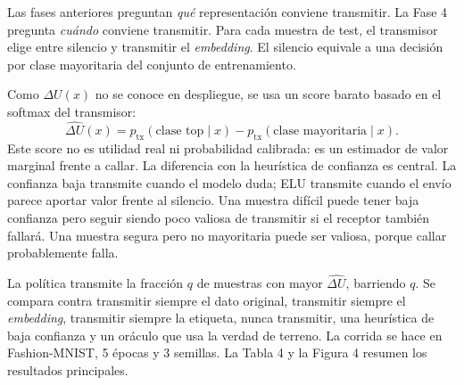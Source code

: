 Las fases anteriores preguntan \emph{qu\'e} representaci\'on conviene transmitir. La Fase 4 pregunta \emph{cu\'ando} conviene transmitir. Para cada muestra de test, el transmisor elige entre silencio y transmitir el \emph{embedding}. El silencio equivale a una decisi\'on por clase mayoritaria del conjunto de entrenamiento.

Como $\Delta U(x)$ no se conoce en despliegue, se usa un score barato basado en el softmax del transmisor:
\begin{equation}
\widehat{\Delta U}(x)=p_{\mathrm{tx}}(\text{clase top}\mid x)-p_{\mathrm{tx}}(\text{clase mayoritaria}\mid x).
\end{equation}
Este score no es utilidad real ni probabilidad calibrada: es un estimador de valor marginal frente a callar. La diferencia con la heur\'istica de confianza es central. La confianza baja transmite cuando el modelo duda; ELU transmite cuando el env\'io parece aportar valor frente al silencio. Una muestra dif\'icil puede tener baja confianza pero seguir siendo poco valiosa de transmitir si el receptor tambi\'en fallar\'a. Una muestra segura pero no mayoritaria puede ser valiosa, porque callar probablemente falla.

La pol\'itica transmite la fracci\'on $q$ de muestras con mayor $\widehat{\Delta U}$, barriendo $q$. Se compara contra transmitir siempre el dato original, transmitir siempre el \emph{embedding}, transmitir siempre la etiqueta, nunca transmitir, una heur\'istica de baja confianza y un or\'aculo que usa la verdad de terreno. La corrida se hace en Fashion-MNIST, 5 \'epocas y 3 semillas. La Tabla 4 y la Figura 4 resumen los resultados principales.

